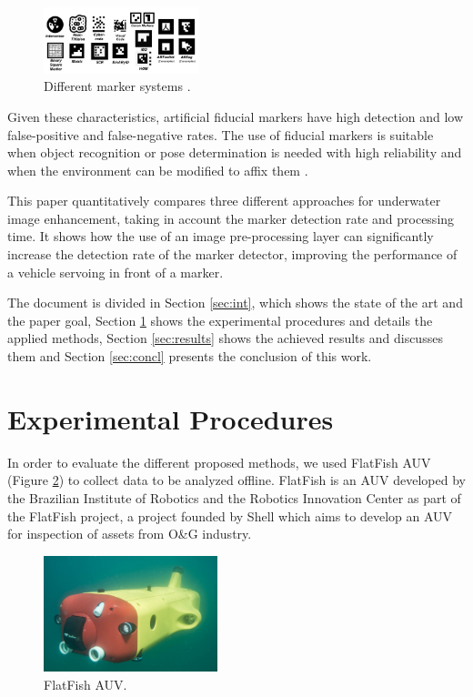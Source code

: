 \documentclass[conference, letterpaper]{IEEEtran}
\begin{document}
\begin{figure}[!ht]
	\centering
    \includegraphics[width=0.40\textwidth]{./fig/marker_systems.png}
    \caption[Different marker systems]{Different marker systems \cite{Fiala2010}.}
	\label{fig:marker_systems}
\end{figure}

Given these characteristics, artificial fiducial markers have high detection
and low false-positive and false-negative rates. The use of fiducial markers is
suitable when object recognition or pose determination is needed with high
reliability and when the environment can be modified to affix them \cite{Fiala2010}. 

This paper quantitatively compares three different approaches for underwater
image enhancement, taking in account the marker detection rate and processing
time. It shows how the use of an image pre-processing layer can significantly
increase the detection rate of the marker detector, improving the performance
of a vehicle servoing in front of a marker.

The document is divided in Section \ref{sec:int}, which shows the state of the art
and the paper goal, Section \ref{sec:exp_proced} shows the experimental
procedures and details the applied methods, Section \ref{sec:results} shows the
achieved results and discusses them and Section \ref{sec:concl} presents the
conclusion of this work.

\section{Experimental Procedures} \label{sec:exp_proced}

In order to evaluate the different proposed methods, we used FlatFish AUV (Figure
\ref{fig:flatfish_1}) \cite{flatfish_jan} to collect data to be analyzed
offline. FlatFish is an AUV developed by the Brazilian Institute of Robotics
and the Robotics Innovation Center as part of the FlatFish project, a project
founded by Shell which aims to develop an AUV for inspection of assets from O\&G industry.

\begin{figure}[!ht]
    \centering
    \includegraphics[width=0.45\textwidth]{./fig/20160317-FF-Test-P1040442.jpg}
    \caption{FlatFish AUV.}
    \label{fig:flatfish_1}
\end{figure}
\end{document}
